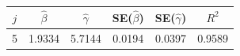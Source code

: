 \begin{tabular}{cccccc}
\toprule
$j$ & $\hat{\beta}$ & $\hat{\gamma}$ & SE($\hat{\beta}$) & SE($\hat{\gamma}$) & $R^2$ \\
\midrule
5 & 1.9334 & 5.7144 & 0.0194 & 0.0397 & 0.9589 \\
\bottomrule
\end{tabular}